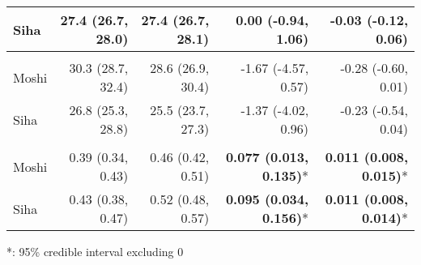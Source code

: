 \begin{table}[t]
\begin{tabular*}{\linewidth}{@{\extracolsep{\fill}}l|rrrr}
Siha & 27.4 (26.7, 28.0) & 27.4 (26.7, 28.1) & 0.00 (-0.94, 1.06) & -0.03 (-0.12, 0.06) \\ 
\midrule\addlinespace[2.5pt]
\multicolumn{5}{l}{UTCI} \\[2.5pt] 
\midrule\addlinespace[2.5pt]
Moshi & 30.3 (28.7, 32.4) & 28.6 (26.9, 30.4) & -1.67 (-4.57, 0.57) & -0.28 (-0.60, 0.01) \\ 
Siha & 26.8 (25.3, 28.8) & 25.5 (23.7, 27.3) & -1.37 (-4.02, 0.96) & -0.23 (-0.54, 0.04) \\ 
\midrule\addlinespace[2.5pt]
\multicolumn{5}{l}{Greenness (NDVI)} \\[2.5pt] 
\midrule\addlinespace[2.5pt]
Moshi & 0.39 (0.34, 0.43) & 0.46 (0.42, 0.51) & \textbf{0.077 (0.013, 0.135)}* & \textbf{0.011 (0.008, 0.015)}* \\ 
Siha & 0.43 (0.38, 0.47) & 0.52 (0.48, 0.57) & \textbf{0.095 (0.034, 0.156)}* & \textbf{0.011 (0.008, 0.014)}* \\ 
\bottomrule
\end{tabular*}
\begin{minipage}{\linewidth}
*: 95\% credible interval excluding 0\\
\end{minipage}
\end{table}

